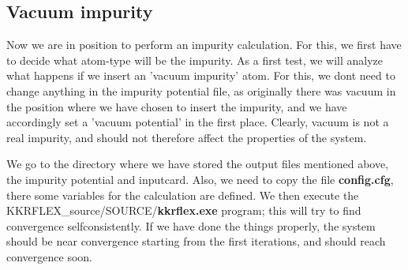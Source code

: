 \documentclass[11pt,fleqn]{book} %
\begin{document}
\subsection{Vacuum impurity}
\label{sec:vacuum-impurity}

Now we are in position to perform an impurity calculation. For this, we
first have to decide what atom-type will be the impurity. As a first test, we
will analyze what happens if we insert an 'vacuum impurity' atom.
For this, we dont need to change anything in the impurity potential file,
as originally there was vacuum in the position where we have chosen to insert the
impurity, and we have accordingly set a 'vacuum potential' in the first place.
Clearly, vacuum is not a real impurity, and should not therefore
affect the properties of the system.


We go to the directory where we have stored the output files mentioned above,
the impurity potential and inputcard. Also, we need to copy the file
\textbf{config.cfg}, there some variables for the calculation are defined.
We then execute the KKRFLEX\_source/SOURCE/\textbf{kkrflex.exe} program; this will try to find
convergence selfconsistently. If we have done the things properly, the system
should be near convergence starting from the first iterations, and should reach
convergence soon.
\end{document}
